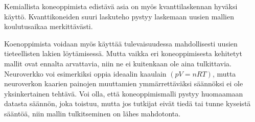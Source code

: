 \documentclass[finnish,twoside,censored,subject,sw-line]{HYthesisML}
\begin{document}
Kemiallista koneoppimista edistävä asia on myös kvanttilaskennan hyväksi käyttö.
Kvanttikoneiden suuri laskuteho pystyy laskemaan uusien mallien koulutusaikaa merkittävästi.

Koenoppimista voidaan myös käyttää tulevaisuudessa mahdollisesti uusien tieteellisten lakien löytämisessä.
Mutta vaikka eri koneoppimisesta kehitetyt mallit ovat ennalta arvattavia, niin ne ei kuitenkaan ole aina tulkittavia.
Neuroverkko voi esimerkiksi oppia ideaalin kaaulain $(pV=nRT)$, mutta neuroverkon kaarien painojen muuttamien ymmärrettäväksi säännöksi ei ole yksinkertainen tehtävä.
Voi olla, että koneoppimismalli pystyy huomaamaan datasta säännön, joka toistuu, mutta jos tutkijat eivät tiedä tai tunne kyseistä sääntöä, niin mallin tulkitseminen on lähes mahdotonta.

\cleardoublepage                          %
{}  %
\printbibliography

\backmatter
\end{document}
